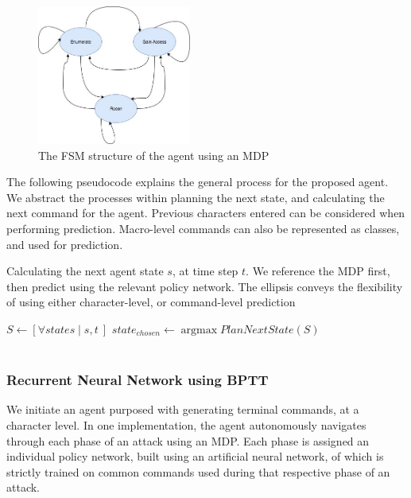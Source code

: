 \documentclass[10pt, titlepage, twocolumn]{article}
\DeclareMathOperator*{\argmax}{argmax}
\newcommand{\ii}{\indent\indent}
\begin{document}
\begin{figure}[H]	
\centering
	\includegraphics[width=0.45\textwidth]{aifsm}
	\caption{The FSM structure of the agent using an MDP}
	\label{aifsm}
\end{figure}

The following pseudocode explains the general process for the proposed agent. We abstract the processes within planning the next state, and calculating the next command for the agent. Previous characters entered can be considered when performing prediction. Macro-level commands can also be represented as classes, and used for prediction.

\begin{algorithm}[H]
  \caption{Calculating the next agent state $s$, at time step $t$. We reference the MDP first, then predict using the relevant policy network. The ellipsis conveys the flexibility of using either character-level, or command-level prediction}
  \begin{algorithmic}[1]
    \Statex
     \State $S \gets [\forall states \mid {s,t\ }] $ 
     \State $state_{chosen} \gets \argmax PlanNextState(S)$ \\
      \ \ \ \ 
    \EndFunction
  \end{algorithmic}
\end{algorithm}


\subsubsection{Recurrent Neural Network using BPTT}
\ii
We initiate an agent purposed with generating terminal commands, at a character level. In one implementation, the agent autonomously navigates through each phase of an attack using an MDP. Each phase is assigned an individual policy network, built using an artificial neural network, of which is strictly trained on common commands used during that respective phase of an attack.
\end{document}
